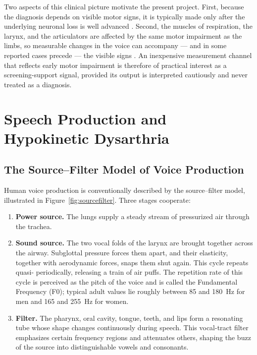 Two aspects of this clinical picture motivate the present project.
First, because the diagnosis depends on visible motor signs, it is
typically made only after the underlying neuronal loss is well advanced
\cite{fearnley1991}. Second, the muscles of respiration, the larynx,
and the articulators are affected by the same motor impairment as the
limbs, so measurable changes in the voice can accompany --- and in some
reported cases precede --- the visible signs \cite{harel2004,rusz2011}.
An inexpensive measurement channel that reflects early motor
impairment is therefore of practical interest as a screening-support
signal, provided its output is interpreted cautiously and never treated
as a diagnosis.

\section{Speech Production and Hypokinetic Dysarthria}

\subsection{The Source--Filter Model of Voice Production}

Human voice production is conventionally described by the source--filter
model, illustrated in Figure~\ref{fig:sourcefilter}. Three stages
cooperate:

\begin{enumerate}
  \item \textbf{Power source.} The lungs supply a steady stream of
        pressurized air through the trachea.
  \item \textbf{Sound source.} The two vocal folds of the larynx are
        brought together across the airway. Subglottal pressure forces
        them apart, and their elasticity, together with aerodynamic
        forces, snaps them shut again. This cycle repeats quasi-%
        periodically, releasing a train of air puffs. The repetition
        rate of this cycle is perceived as the pitch of the voice and is
        called the Fundamental Frequency (F0); typical adult values lie
        roughly between 85 and 180~Hz for men and 165 and 255~Hz for
        women.
  \item \textbf{Filter.} The pharynx, oral cavity, tongue, teeth, and
        lips form a resonating tube whose shape changes continuously
        during speech. This vocal-tract filter emphasizes certain
        frequency regions and attenuates others, shaping the buzz of
        the source into distinguishable vowels and consonants.
\end{enumerate}


